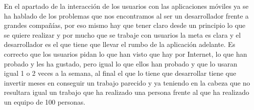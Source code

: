 En el apartado de la interacción de los usuarios con las aplicaciones móviles ya se ha hablado de los problemas que nos encontramos al ser un desarrollador frente a grandes compañías, por eso mismo hay que tener claro desde un principio lo que se quiere realizar y por mucho que se trabaje con usuarios la meta es clara y el desarrollador es el que tiene que llevar el rumbo de la aplicación adelante. Es correcto que los usuarios pidan lo que han visto que hay por Internet, lo que han probado y les ha gustado, pero igual lo que ellos han probado y que lo usaran igual 1 o 2 veces a la semana, al final el que lo tiene que desarrollar tiene que invertir meses en conseguir un trabajo parecido y ya teniendo en la cabeza que no resultara igual un trabajo que ha realizado una persona frente al que ha realizado un equipo de 100 personas.






















